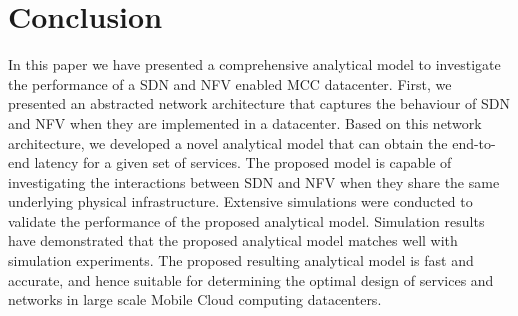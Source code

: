 
\section{Conclusion}
\label{sec:conclusions}

In this paper we have presented a comprehensive analytical model to investigate the performance of a SDN and NFV enabled MCC datacenter. First, we presented an abstracted  network architecture that captures the behaviour of SDN and NFV when they are implemented in a datacenter. Based on this network architecture, we developed a novel analytical model that can obtain the end-to-end latency for a given set of services. The proposed model is capable of investigating the interactions between SDN and NFV when they share the same underlying physical infrastructure. Extensive simulations were conducted to validate the performance of the proposed analytical model. Simulation results have demonstrated that the proposed analytical model matches well with simulation experiments. The proposed resulting analytical model is fast and accurate, and hence suitable for determining the optimal design of services and networks in large scale Mobile Cloud computing datacenters.
